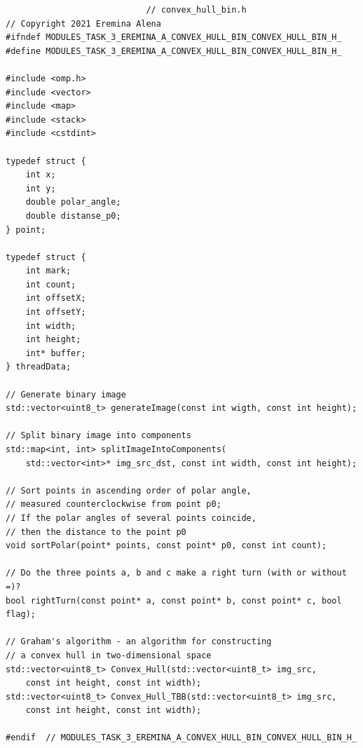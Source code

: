 \documentclass{report}
\begin{document}
\begin{lstlisting}
							// convex_hull_bin.h
// Copyright 2021 Eremina Alena
#ifndef MODULES_TASK_3_EREMINA_A_CONVEX_HULL_BIN_CONVEX_HULL_BIN_H_
#define MODULES_TASK_3_EREMINA_A_CONVEX_HULL_BIN_CONVEX_HULL_BIN_H_

#include <omp.h>
#include <vector>
#include <map>
#include <stack>
#include <cstdint>

typedef struct {
    int x;
    int y;
    double polar_angle;
    double distanse_p0;
} point;

typedef struct {
    int mark;
    int count;
    int offsetX;
    int offsetY;
    int width;
    int height;
    int* buffer;
} threadData;

// Generate binary image
std::vector<uint8_t> generateImage(const int wigth, const int height);

// Split binary image into components
std::map<int, int> splitImageIntoComponents(
    std::vector<int>* img_src_dst, const int width, const int height);

// Sort points in ascending order of polar angle,
// measured counterclockwise from point p0;
// If the polar angles of several points coincide,
// then the distance to the point p0
void sortPolar(point* points, const point* p0, const int count);

// Do the three points a, b and c make a right turn (with or without =)?
bool rightTurn(const point* a, const point* b, const point* c, bool flag);

// Graham's algorithm - an algorithm for constructing
// a convex hull in two-dimensional space
std::vector<uint8_t> Convex_Hull(std::vector<uint8_t> img_src,
    const int height, const int width);
std::vector<uint8_t> Convex_Hull_TBB(std::vector<uint8_t> img_src,
    const int height, const int width);

#endif  // MODULES_TASK_3_EREMINA_A_CONVEX_HULL_BIN_CONVEX_HULL_BIN_H_

\end{lstlisting}
\end{document}
